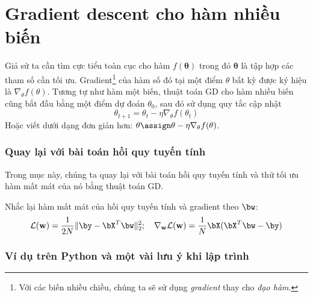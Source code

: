 \section{Gradient descent cho hàm nhiều biến}
Giả sử ta cần tìm cực tiểu toàn cục cho hàm $f(\mathbf{\theta})$ trong đó
$\mathbf{\theta}$ là tập hợp các tham số cần tối ưu. Gradient\footnote{Với các
biến nhiều chiều, chúng ta sẽ sử dụng \textit{gradient} thay cho \textit{đạo
hàm}.} của hàm số đó tại một điểm $\theta$ bất kỳ được ký hiệu là
$\nabla_{\theta}f(\theta)$. Tương tự như hàm một biến, thuật toán GD cho hàm
nhiều biến cũng bắt đầu bằng một điểm dự đoán $\theta_{0}$, sau đó sử dụng quy
tắc cập nhật
\begin{equation}
\boxed{
\theta_{t+1} = \theta_{t} - \eta \nabla_{\theta} f(\theta_{t})
}
\end{equation}
Hoặc viết dưới dạng đơn giản hơn: $\theta \assign \theta - \eta \nabla_{\theta}
f(\theta)$.



\subsubsection{Quay lại với bài toán hồi quy tuyến tính}

Trong mục này, chúng ta quay lại với bài toán hồi quy tuyến tính và thử tối ưu
hàm mất mát của nó bằng thuật toán GD.

Nhắc lại hàm mất mát của hồi quy tuyến tính và gradient theo $\bw$:
\begin{equation}
\mathcal{L}(\mathbf{w}) = \frac{1}{2N}\|\by - \bX^T\bw\|_2^2; \quad \nabla_{\mathbf{w}}\mathcal{L}(\mathbf{w}) =
\frac{1}{N}\bX(\bX^T\bw - \by)
\end{equation}


\subsubsection{Ví dụ trên Python và một vài lưu ý khi lập trình}




